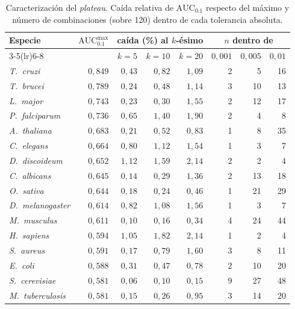 \documentclass[11pt,a4paper]{article}
\newcommand{\AUCcero}{\text{AUC}_{0.1}}
\newcommand{\spn}[1]{\textit{#1}}
\begin{document}
\begin{table}[H]
\centering
\caption{Caracterización del \emph{plateau}. Caída relativa de $\AUCcero$
respecto del máximo y número de combinaciones (sobre 120) dentro de cada
tolerancia absoluta.}
\label{tab:plateau}
\small
\begin{tabular}{lrrrrrrr}
\toprule
\multirow{2}{*}{Especie} & \multirow{2}{*}{$\AUCcero^{\max}$}
 & \multicolumn{3}{c}{caída (\%) al $k$-ésimo} & \multicolumn{3}{c}{$n$ dentro de} \\
\cmidrule(lr){3-5}\cmidrule(lr){6-8}
 & & $k{=}5$ & $k{=}10$ & $k{=}20$ & $0{,}001$ & $0{,}005$ & $0{,}01$ \\
\midrule
\spn{T.~cruzi}        & $0{,}849$ & $0{,}43$ & $0{,}82$ & $1{,}09$ & 2 & 5  & 16 \\
\spn{T.~brucei}       & $0{,}789$ & $0{,}24$ & $0{,}48$ & $1{,}14$ & 3 & 10 & 13 \\
\spn{L.~major}        & $0{,}743$ & $0{,}23$ & $0{,}30$ & $1{,}55$ & 2 & 12 & 17 \\
\spn{P.~falciparum}   & $0{,}736$ & $0{,}65$ & $1{,}40$ & $1{,}90$ & 2 & 4  & 8  \\
\spn{A.~thaliana}     & $0{,}683$ & $0{,}21$ & $0{,}52$ & $0{,}83$ & 1 & 8  & 35 \\
\spn{C.~elegans}      & $0{,}664$ & $0{,}80$ & $1{,}12$ & $1{,}54$ & 1 & 3  & 7  \\
\spn{D.~discoideum}   & $0{,}652$ & $1{,}12$ & $1{,}59$ & $2{,}14$ & 2 & 2  & 4  \\
\spn{C.~albicans}     & $0{,}645$ & $0{,}14$ & $0{,}29$ & $1{,}36$ & 2 & 13 & 18 \\
\spn{O.~sativa}       & $0{,}644$ & $0{,}18$ & $0{,}24$ & $0{,}46$ & 1 & 21 & 29 \\
\spn{D.~melanogaster} & $0{,}614$ & $0{,}82$ & $1{,}08$ & $1{,}56$ & 1 & 3  & 7  \\
\spn{M.~musculus}     & $0{,}611$ & $0{,}10$ & $0{,}16$ & $0{,}34$ & 4 & 24 & 44 \\
\spn{H.~sapiens}      & $0{,}594$ & $1{,}05$ & $1{,}82$ & $2{,}14$ & 1 & 2  & 4  \\
\spn{S.~aureus}       & $0{,}591$ & $0{,}17$ & $0{,}79$ & $1{,}60$ & 3 & 8  & 11 \\
\spn{E.~coli}         & $0{,}588$ & $0{,}31$ & $0{,}47$ & $0{,}78$ & 2 & 10 & 20 \\
\spn{S.~cerevisiae}   & $0{,}581$ & $0{,}06$ & $0{,}10$ & $0{,}15$ & 9 & 27 & 48 \\
\spn{M.~tuberculosis} & $0{,}581$ & $0{,}15$ & $0{,}26$ & $0{,}95$ & 3 & 14 & 20 \\
\bottomrule
\end{tabular}
\end{table}
\end{document}
